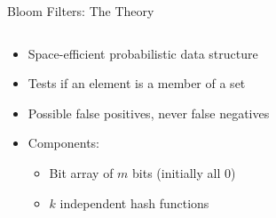 \begin{frame}{Bloom Filters: The Theory}
  \begin{columns}
    \begin{column}{0.6\textwidth}
      \begin{itemize}
        \item Space-efficient probabilistic data structure
        \item Tests if an element is a member of a set
        \item Possible false positives, never false negatives
        \item Components:
              \begin{itemize}
                \item Bit array of $m$ bits (initially all 0)
                \item $k$ independent hash functions
              \end{itemize}
      \end{itemize}
    \end{column}
    \begin{column}{0.4\textwidth}
    \end{column}
  \end{columns}
\end{frame}

